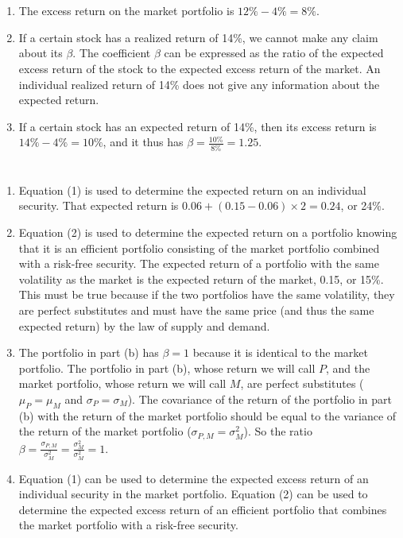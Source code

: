 \documentclass[12pt]{article}
\begin{document}
\section{}
\begin{enumerate}
    \item The excess return on the market portfolio is $12\%-4\%=8\%$. 
    \item If a certain stock has a realized return of 14\%, we cannot make any claim about its $\beta$. The coefficient $\beta$ can be expressed as the ratio of the expected excess return of the stock to the expected excess return of the market. An individual realized return of 14\% does not give any information about the expected return. 
    \item If a certain stock has an expected return of 14\%, then its excess return is $14\%-4\%=10\%$, and it thus has $\beta=\frac{10\%}{8\%}=1.25$.
\end{enumerate}
\section{}
\begin{enumerate}
    \item Equation (1) is used to determine the expected return on an individual security. That expected return is $0.06+(0.15-0.06)\times 2=0.24$, or 24\%.
    \item Equation (2) is used to determine the expected return on a portfolio knowing that it is an efficient portfolio consisting of the market portfolio combined with a risk-free security. The expected return of a portfolio with the same volatility as the market is the expected return of the market, 0.15, or 15\%. This must be true because if the two portfolios have the same volatility, they are perfect substitutes and must have the same price (and thus the same expected return) by the law of supply and demand.
    \item The portfolio in part (b) has $\beta=1$ because it is identical to the market portfolio. The portfolio in part (b), whose return we will call $P$, and the market portfolio, whose return we will call $M$, are perfect substitutes ($\mu_P=\mu_M$ and $\sigma_P=\sigma_M$). The covariance of the return of the portfolio in part (b) with the return of the market portfolio should be equal to the variance of the return of the market portfolio ($\sigma_{P,M}=\sigma_M^2$). So the ratio $\beta=\frac{\sigma_{P,M}}{\sigma_M^2}=\frac{\sigma_M^2}{\sigma_M^2}=1$.
    \item Equation (1) can be used to determine the expected excess return of an individual security in the market portfolio. Equation (2) can be used to determine the expected excess return of an efficient portfolio that combines the market portfolio with a risk-free security.
\end{enumerate}
\end{document}
